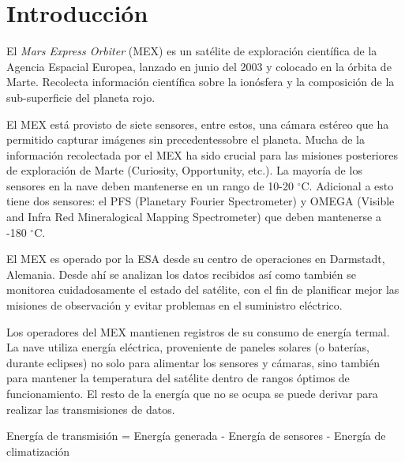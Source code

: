 \documentclass[../Main.tex]{subfiles}
\begin{document}
\section*{Introducción}

El \textit{Mars Express Orbiter} (MEX) es un satélite de exploración científica de la Agencia Espacial Europea, lanzado en junio del 2003 y colocado en la órbita de Marte. Recolecta información científica sobre la ionósfera y la composición de la sub-superficie del planeta rojo.
\newline \par
El MEX está provisto de siete sensores, entre estos, una cámara estéreo que ha permitido capturar imágenes sin precedentessobre el planeta. Mucha de la información recolectada por el MEX ha sido crucial para las misiones posteriores de exploración de Marte (Curiosity, Opportunity, etc.). La mayoría de los sensores en la nave deben mantenerse en un rango de 10-20 $^{\circ}$C. Adicional a esto tiene dos sensores: el PFS (Planetary Fourier Spectrometer) y OMEGA (Visible and Infra Red Mineralogical Mapping Spectrometer) que deben mantenerse a -180 $^{\circ}$C.
\newline \par
El MEX es operado por la ESA desde su centro de operaciones en Darmstadt, Alemania. Desde ahí se analizan los datos recibidos así como también se monitorea cuidadosamente el estado del satélite, con el fin de planificar mejor las misiones de observación y evitar problemas en el suministro eléctrico.
\newline \par
Los operadores del MEX mantienen registros de su consumo de energía termal. La nave utiliza energía eléctrica, proveniente de paneles solares (o baterías, durante eclipses) no solo para alimentar los sensores y cámaras, sino también para mantener la temperatura del satélite dentro de rangos óptimos de funcionamiento. El resto de la energía que no se ocupa se puede derivar para realizar las transmisiones de datos.

\begin{center}
Energía de transmisión = Energía generada - Energía de sensores - Energía de climatización
\end{center}
\end{document}

